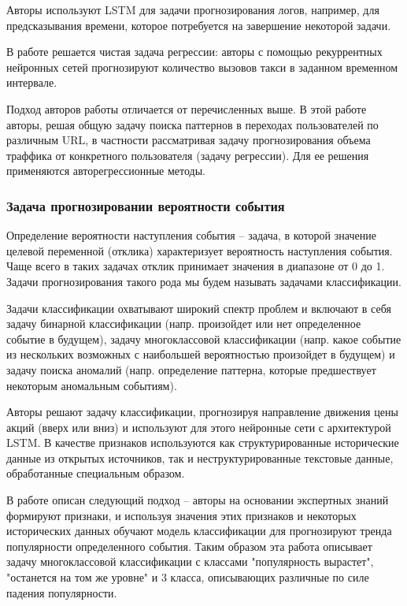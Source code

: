 Авторы \cite{predictive_monitoring_LSTM} используют LSTM для задачи прогнозирования логов, например, для предсказывания времени, которое потребуется на завершение некоторой задачи.

В работе \cite{uber_mulitvar_forecasting} решается чистая задача регрессии: авторы с помощью рекуррентных нейронных сетей прогнозируют количество вызовов такси в заданном временном интервале. 

Подход авторов работы \cite{triplet_event_forecasting} отличается от перечисленных выше. В этой работе авторы, решая общую задачу поиска паттернов в переходах пользователей по различным URL, в частности рассматривая задачу прогнозирования объема траффика от конкретного пользователя (задачу регрессии). Для ее решения применяются авторегрессионные методы.

\subsubsection{Задача прогнозировании вероятности события}
Определение вероятности наступления события -- задача, в которой значение целевой переменной (отклика) характеризует вероятность наступления события. Чаще всего в таких задачах отклик принимает значения в диапазоне от 0 до 1. Задачи прогнозирования такого рода мы будем называть задачами классификации.

Задачи классификации охватывают широкий спектр проблем и включают в себя задачу бинарной классификации (напр. произойдет или нет определенное событие в будущем), задачу многоклассовой классификации (напр. какое событие из нескольких возможных с наибольшей вероятностью произойдет в будущем) и задачу поиска аномалий (напр. определение паттерна, которые предшествует некоторым аномальным событиям).

Авторы \cite{struct_unstruct_prediction} решают задачу классификации, прогнозируя направление движения цены акций (вверх или вниз) и используют для этого нейронные сети с архитектурой LSTM. В качестве признаков используются как структурированные исторические данные из открытых источников, так и неструктурированные текстовые данные, обработанные специальным образом.

В работе \cite{twitter_predicting} описан следующий подход -- авторы на основании экспертных знаний формируют признаки, и используя значения этих признаков и некоторых исторических данных обучают модель классификации для прогнозируют тренда популярности определенного события. Таким образом эта работа описывает задачу многоклассовой классификации с классами "популярность вырастет", "останется на том же уровне" и 3 класса, описывающих различные по силе падения популярности.

